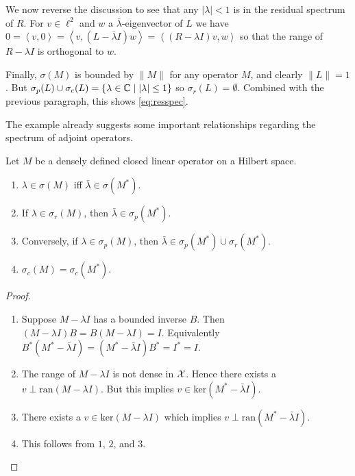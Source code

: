 \begin{example}
    We now reverse the discussion to see that any $| \lambda | < 1$ is in the 
    residual spectrum of $R$. For $v \in \ell^2$ and $w$ a $\bar{\lambda}$-eigenvector of 
    $L$ we have 
    $0 = \left\langle v, 0 \right\rangle 
    = \left\langle v, (L - \bar{\lambda} I) w \right\rangle 
    = \left\langle (R - \lambda I) v, w \right\rangle$ so that the range of 
    $R - \lambda I$ is orthogonal to $w$. 

    Finally, $\sigma (M)$ is bounded by $\| M \|$ for any operator $M$, and clearly 
    $\| L \| = 1$. But $\sigma_p (L) \cup \sigma_c (L) = 
    \left\{ \lambda \in \mathbb{C} \mid | \lambda | \leq 1 \right\}$ so 
    $\sigma_r (L) = \emptyset$. Combined with the previous paragraph, this shows 
    \ref{eq:resspec}. 

\end{example}

The example already suggests some important relationships regarding the spectrum of 
adjoint operators. 

\begin{theorem}
    \label{thm:spec_relations_adjoints}
    Let $M$ be a densely defined closed linear operator on a Hilbert space. 
    
    \begin{enumerate}
        \item $\lambda \in \sigma (M)$ iff $\bar{\lambda} \in \sigma (M^*)$. 
        \item If $\lambda \in \sigma_r (M)$, then $\bar{\lambda} \in \sigma_p (M^*)$. 
        \item Conversely, if $\lambda \in \sigma_p (M)$, then 
              $\bar{\lambda} \in \sigma_p (M^*) \cup \sigma_r (M^*)$. 
        \item $\sigma_c (M) = \sigma_c (M^*)$. 
    \end{enumerate}
\end{theorem}

\begin{proof}
    \begin{enumerate}
        \item Suppose $M - \lambda I$ has a bounded inverse $B$. Then 
              $(M - \lambda I) B = B (M - \lambda I) = I$. Equivalently 
              $B^* (M^* - \bar{\lambda} I) = (M^* - \bar{\lambda} I) B^* = I^* = I$. 
        \item The range of $M - \lambda I$ is not dense in $\mathcal{X}$. Hence there exists a 
              $v \perp \text{ran} (M - \lambda I)$. But this implies 
              $v \in \text{ker} (M^* - \bar{\lambda} I)$. 
        \item There exists a $v \in \text{ker} (M - \lambda I)$ which implies 
              $v \perp \text{ran} (M^* - \bar{\lambda} I)$. 
        \item This follows from $1$, $2$, and $3$. 
    \end{enumerate}
\end{proof}


